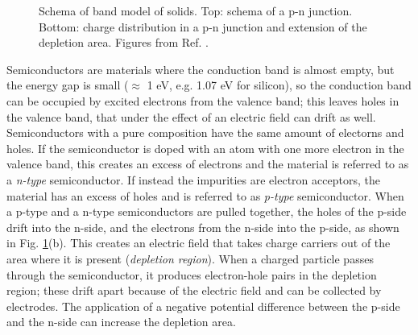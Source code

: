 \begin{figure}[ht]
\centering
{}
\caption{ Schema of band model of solids.  Top: schema of a p-n junction. Bottom: charge distribution in a p-n junction and extension of the depletion area. Figures from Ref. \cite{grupen_shwartz_2008}.}
\label{fig:det:band}
\end{figure}

Semiconductors are materials where the conduction band is almost empty, but the energy gap is small ($\approx$ 1 eV, e.g. 1.07 eV for silicon), so the conduction band can be occupied by excited electrons from the valence band; this leaves holes in the valence band, that under the effect of an electric field can drift as well. Semiconductors with a pure composition have the same amount of electorns and holes. If the semiconductor is doped with an atom with one more electron in the valence band, this creates an excess of electrons and the material is referred to as a \textit{n-type} semiconductor. If instead the impurities are electron acceptors, the material has an excess of holes and is referred to as \textit{p-type} semiconductor. When a p-type and a n-type semiconductors are pulled together, the holes of the p-side drift into the n-side, and the electrons from the n-side into the p-side, as shown in Fig. \ref{fig:det:band}(b). This creates an electric field that takes charge carriers out of the area where it is present (\textit{depletion region}). When a charged particle passes through the semiconductor, it produces electron-hole pairs in the depletion region; these drift apart because of the electric field and can be collected by electrodes. The application of a negative potential difference between the p-side and the n-side can increase the depletion area.

